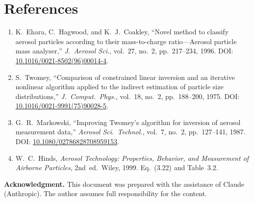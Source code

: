 \documentclass[11pt,a4paper]{article}
\begin{document}
\section{References}
\label{sec:references}

\begin{enumerate}
  \item K.~Ehara, C.~Hagwood, and K.~J.~Coakley,
    ``Novel method to classify aerosol particles according to their
    mass-to-charge ratio---Aerosol particle mass analyser,''
    \textit{J.\ Aerosol Sci.}, vol.~27, no.~2, pp.~217--234, 1996.
    DOI: \href{https://doi.org/10.1016/0021-8502(96)00014-4}%
    {10.1016/0021-8502(96)00014-4}.

  \item S.~Twomey,
    ``Comparison of constrained linear inversion and an iterative nonlinear
    algorithm applied to the indirect estimation of particle size
    distributions,''
    \textit{J.\ Comput.\ Phys.}, vol.~18, no.~2, pp.~188--200, 1975.
    DOI: \href{https://doi.org/10.1016/0021-9991(75)90028-5}%
    {10.1016/0021-9991(75)90028-5}.

  \item G.~R.~Markowski,
    ``Improving Twomey's algorithm for inversion of aerosol measurement
    data,''
    \textit{Aerosol Sci.\ Technol.}, vol.~7, no.~2, pp.~127--141, 1987.
    DOI: \href{https://doi.org/10.1080/02786828708959153}%
    {10.1080/02786828708959153}.

  \item W.~C.~Hinds,
    \textit{Aerosol Technology: Properties, Behavior, and Measurement of
    Airborne Particles}, 2nd~ed.\ Wiley, 1999.  Eq.~(3.22) and Table~3.2.
\end{enumerate}

\bigskip
\noindent\textbf{Acknowledgment.}\quad
This document was prepared with the assistance of Claude (Anthropic).
The author assumes full responsibility for the content.
\end{document}

